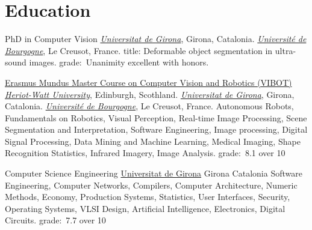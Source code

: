 \section{Education}

{PhD in Computer Vision}
{}
{}
{}
{\href{http://www.udg.edu}{\emph{Universitat de Girona}}, Girona, Catalonia.
  \newline\href{http://www.u-bourgogne.fr}{\emph{Universit\'{e} de Bourgogne}}, Le Creusot, France.
  \newline
  title: Deformable object segmentation in ultra-sound images.
  \newline grade:~Unanimity excellent with honors.
}

{\href{http://www.vibot.org}{Erasmus Mundus Master Course on Computer Vision and Robotics (VIBOT)}}
{}
{}
{}
{\href{http://www.hw.ac.uk}{\emph{Heriot-Watt University}}, Edinburgh, Scothland.
  \newline\href{http://www.udg.edu}{\emph{Universitat de Girona}}, Girona, Catalonia.
  \newline\href{http://www.u-bourgogne.fr}{\emph{Universit\'{e} de Bourgogne}}, Le Creusot, France.
  \newline
Autonomous Robots, Fundamentals on Robotics, Visual Perception, Real-time Image Processing, Scene Segmentation and Interpretation, Software Engineering, Image processing, Digital Signal Processing, Data Mining and Machine Learning, Medical Imaging, Shape Recognition Statistics, Infrared Imagery, Image Analysis.
  \newline grade:~8.1 over 10
}

                {Computer Science Engineering}
                {\newline\href{http://www.udg.edu}{Universitat de Girona}}
                {Girona}
                {Catalonia}
                {Software Engineering, Computer Networks, Compilers, Computer
                 Architecture, Numeric Methods, Economy, Production Systems,
                 Statistics, User Interfaces, Security, Operating Systems, VLSI
                 Design, Artificial Intelligence, Electronics, Digital Circuits.
                 \newline grade:~7.7 over 10
                }

